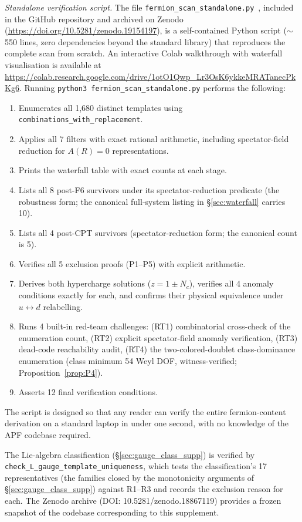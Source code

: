 \documentclass[11pt]{article}
\theoremstyle{definition}
\begin{document}
\smallskip\noindent\textit{Standalone verification script.}\quad
The file \texttt{fermion\_scan\_standalone.py}~\cite{BrookeFermionScan},
included in the GitHub repository and archived on Zenodo
(\url{https://doi.org/10.5281/zenodo.19154197}),
is a self-contained Python script ($\sim$550 lines, zero dependencies
beyond the standard library) that reproduces the complete scan from
scratch.  An interactive Colab walkthrough with waterfall visualisation
is available at
\url{https://colab.research.google.com/drive/1otO1Qwp_Lr3OsK6ykkeMRATanecPkKg6}.
Running \texttt{python3 fermion\_scan\_standalone.py} performs the following:
\begin{enumerate}[nosep,label=(\arabic*)]
  \item Enumerates all 1{,}680 distinct templates using
  \texttt{combinations\_with\_replacement}.
  \item Applies all 7 filters with exact rational arithmetic, including
  spectator-field reduction for $A(R) = 0$ representations.
  \item Prints the waterfall table with exact counts at each stage.
  \item Lists all 8 post-F6 survivors under its spectator-reduction
  predicate (the robustness form; the canonical full-system listing in
  \S\ref{sec:waterfall} carries 10).
  \item Lists all 4 post-CPT survivors (spectator-reduction form; the
  canonical count is 5).
  \item Verifies all 5 exclusion proofs (P1--P5) with explicit arithmetic.
  \item Derives both hypercharge solutions ($z = 1 \pm N_c$),
  verifies all 4 anomaly conditions exactly for each, and confirms
  their physical equivalence under $u \leftrightarrow d$ relabelling.
  \item Runs 4 built-in red-team challenges: (RT1) combinatorial
  cross-check of the enumeration count, (RT2) explicit spectator-field
  anomaly verification, (RT3) dead-code reachability audit, (RT4) the
  two-colored-doublet class-dominance enumeration (class minimum 54
  Weyl DOF, witness-verified; Proposition~\ref{prop:P4}).
  \item Asserts 12 final verification conditions.
\end{enumerate}
The script is designed so that any reader can verify the entire
fermion-content derivation on a standard laptop in under one second,
with no knowledge of the APF codebase required.

The Lie-algebra classification (\S\ref{sec:gauge_class_supp}) is verified by
\texttt{check\_L\_gauge\_template\_uniqueness}, which tests the
classification's 17 representatives (the families closed by the
monotonicity arguments of \S\ref{sec:gauge_class_supp}) against
R1--R3 and records the exclusion reason for each.  The Zenodo archive
(DOI: 10.5281/zenodo.18867119) provides a frozen snapshot of the
codebase corresponding to this supplement.
\end{document}
